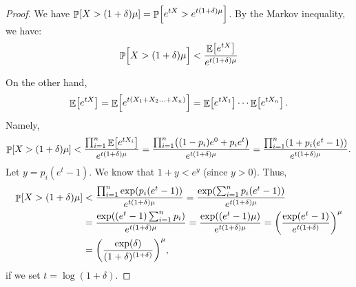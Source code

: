 \begin{proof}
    We have $\displaystyle \Prob{ X > (1+\delta)\mu } = \Prob{ e^{t X}
       > e^{t(1+\delta)\mu}}$.  By the Markov inequality, we have:
    \begin{align*}
        \Prob{\Big. X > (1+\delta)\mu } < \frac{ \Ex{e^{t
                 X}}}{e^{t(1+\delta)\mu}}
    \end{align*}

    On the other hand,
    \begin{align*}
        \mathop{\mathbb{E}}\!\left[ {e^{t X} } \right] = \mathop{\mathbb{E}}\!\left[ { e^{t(X_1 + X_2 \ldots + X_n)} } \right] =
        \mathop{\mathbb{E}}\!\left[ {e^{t X_1}} \right] \cdots \mathop{\mathbb{E}}\!\left[ {e^{t X_n}} \right].
    \end{align*}
    Namely,
    \begin{align*}
        \Prob{ X > (1+\delta)\mu } < \frac{\prod_{i=1}^n \Ex{e^{t
                 X_i}}}{e^{t(1+\delta)\mu}} = \frac{\prod_{i=1}^n
           \pth{ (1-p_i)e^0 + p_i e^{t }}} {e^{t(1+\delta)\mu}} =
        \frac{\prod_{i=1}^n \pth{ 1+ p_i(e^{t} -1 ) }}
        {e^{t(1+\delta)\mu}}.
    \end{align*}
    Let $y = p_i (e^{t} - 1 )$. We know that $1+y < e^y$ (since $y >
    0$). Thus,
    \begin{align*}
        \Prob{ X > (1+\delta)\mu }%
        &<%
        \frac{\prod_{i=1}^n { \exp( p_i(e^{t} -1 )) }}
        {e^{t(1+\delta)\mu}}%
        =%
        \frac{\exp \pth{ \sum_{i=1}^n p_i(e^{t} -1 ) }}
        {e^{t(1+\delta)\mu}}%
        \\&%
        =%
        \frac{\exp \pth{ (e^{t} -1 )\sum_{i=1}^n p_i }}
        {e^{t(1+\delta)\mu}} = \frac{\exp \pth{ (e^{t} -1 )\mu }}
        {e^{t(1+\delta)\mu}} = \pth{\frac{\exp \pth{ e^{t} -1 }}
           {e^{t(1+\delta)}}}^\mu%
        \\&%
        =%
        \pth{\frac{\exp \pth{ \delta }}
           {(1+\delta)^{(1+\delta)}}}^\mu,
    \end{align*}
    if we set $t = \log ( 1+\delta)$.
\end{proof}


